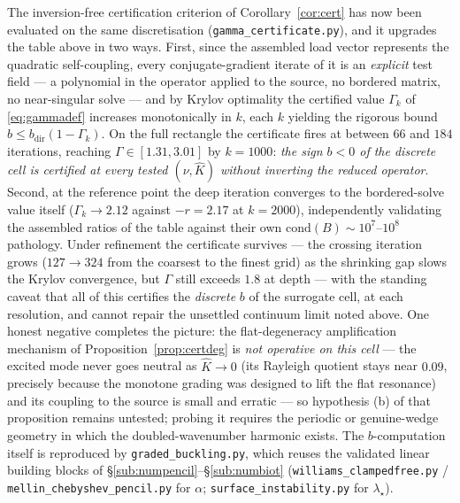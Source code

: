 The inversion-free certification criterion of Corollary~\ref{cor:cert} has now been evaluated on the same
discretisation (\texttt{gamma\_certificate.py}), and it upgrades the table above in two ways. First, since the
assembled load vector represents the quadratic self-coupling, every conjugate-gradient iterate of it is an
\emph{explicit} test field --- a polynomial in the operator applied to the source, no bordered matrix, no
near-singular solve --- and by Krylov optimality the certified value $\Gamma_k$ of \eqref{eq:gammadef} increases
monotonically in $k$, each $k$ yielding the rigorous bound $b\le b_{\mathrm{dir}}(1-\Gamma_k)$. On the full rectangle
the certificate fires at between $66$ and $184$ iterations, reaching $\Gamma\in[1.31,3.01]$ by $k=1000$:
\emph{the sign $b<0$ of the discrete cell is certified at every tested $(\nu,\hat K)$ without inverting the reduced
operator}. Second, at the reference point the deep iteration converges to the bordered-solve value itself
($\Gamma_k\to2.12$ against $-r=2.17$ at $k=2000$), independently validating the assembled ratios of the table against
their own $\mathrm{cond}(B)\sim10^{7}$--$10^{8}$ pathology. Under refinement the certificate survives --- the
crossing iteration grows ($127\to324$ from the coarsest to the finest grid) as the shrinking gap slows the Krylov
convergence, but $\Gamma$ still exceeds $1.8$ at depth --- with the standing caveat that all of this certifies the
\emph{discrete} $b$ of the surrogate cell, at each resolution, and cannot repair the unsettled continuum limit noted
above. One honest negative completes the picture: the flat-degeneracy amplification mechanism of
Proposition~\ref{prop:certdeg} is \emph{not operative on this cell} --- the excited mode never goes neutral as
$\hat K\to0$ (its Rayleigh quotient stays near $0.09$, precisely because the monotone grading was designed to lift
the flat resonance) and its coupling to the source is small and erratic --- so hypothesis (b) of that proposition
remains untested; probing it requires the periodic or genuine-wedge geometry in which the doubled-wavenumber
harmonic exists. The $b$-computation itself is reproduced by \texttt{graded\_buckling.py}, which reuses the validated
linear building blocks of \S\ref{sub:numpencil}--\S\ref{sub:numbiot} (\texttt{williams\_clampedfree.py} /
\texttt{mellin\_chebyshev\_pencil.py} for $\alpha$; \texttt{surface\_instability.py} for $\lambda_\star$).


